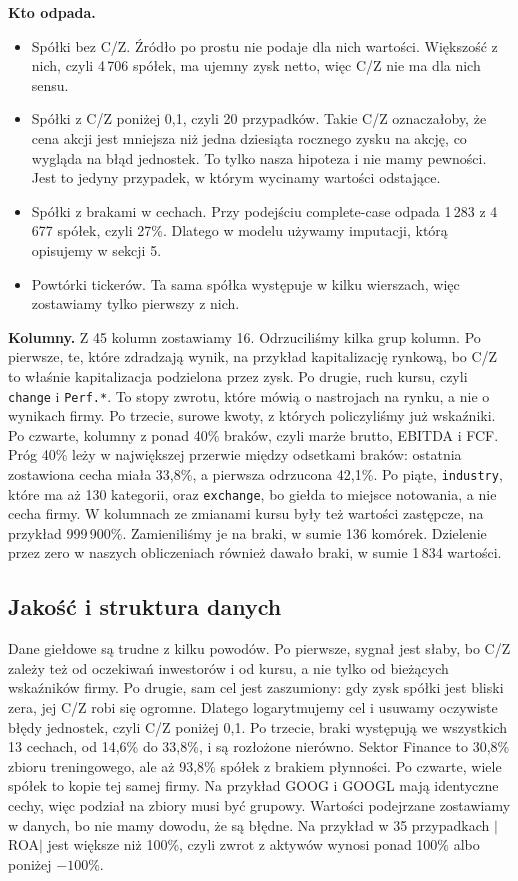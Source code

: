 ﻿\documentclass[10pt,twocolumn,a4paper]{article}
\begin{document}
\textbf{Kto odpada.}
\begin{itemize}
\item Spółki bez C/Z. Źródło po prostu nie podaje dla nich wartości. Większość z nich, czyli 4\,706 spółek, ma ujemny zysk netto, więc C/Z nie ma dla nich sensu.
\item Spółki z C/Z poniżej 0,1, czyli 20 przypadków. Takie C/Z oznaczałoby, że cena akcji jest mniejsza niż jedna dziesiąta rocznego zysku na akcję, co wygląda na błąd jednostek. To tylko nasza hipoteza i nie mamy pewności. Jest to jedyny przypadek, w którym wycinamy wartości odstające.
\item Spółki z brakami w cechach. Przy podejściu complete-case odpada 1\,283 z 4\,677 spółek, czyli 27\%. Dlatego w modelu używamy imputacji, którą opisujemy w sekcji 5.
\item Powtórki tickerów. Ta sama spółka występuje w kilku wierszach, więc zostawiamy tylko pierwszy z nich.
\end{itemize}

\textbf{Kolumny.} Z 45 kolumn zostawiamy 16. Odrzuciliśmy kilka grup kolumn. Po pierwsze, te, które zdradzają wynik, na przykład kapitalizację rynkową, bo C/Z to właśnie kapitalizacja podzielona przez zysk. Po drugie, ruch kursu, czyli \texttt{change} i \texttt{Perf.*}. To stopy zwrotu, które mówią o nastrojach na rynku, a nie o wynikach firmy. Po trzecie, surowe kwoty, z których policzyliśmy już wskaźniki. Po czwarte, kolumny z ponad 40\% braków, czyli marże brutto, EBITDA i FCF. Próg 40\% leży w największej przerwie między odsetkami braków: ostatnia zostawiona cecha miała 33,8\%, a pierwsza odrzucona 42,1\%. Po piąte, \texttt{industry}, które ma aż 130 kategorii, oraz \texttt{exchange}, bo giełda to miejsce notowania, a nie cecha firmy. W kolumnach ze zmianami kursu były też wartości zastępcze, na przykład 999\,900\%. Zamieniliśmy je na braki, w sumie 136 komórek. Dzielenie przez zero w naszych obliczeniach również dawało braki, w sumie 1\,834 wartości.

\subsection{Jakość i struktura danych}
Dane giełdowe są trudne z kilku powodów. Po pierwsze, sygnał jest słaby, bo C/Z zależy też od oczekiwań inwestorów i od kursu, a nie tylko od bieżących wskaźników firmy. Po drugie, sam cel jest zaszumiony: gdy zysk spółki jest bliski zera, jej C/Z robi się ogromne. Dlatego logarytmujemy cel i usuwamy oczywiste błędy jednostek, czyli C/Z poniżej 0,1. Po trzecie, braki występują we wszystkich 13 cechach, od 14,6\% do 33,8\%, i są rozłożone nierówno. Sektor Finance to 30,8\% zbioru treningowego, ale aż 93,8\% spółek z brakiem płynności. Po czwarte, wiele spółek to kopie tej samej firmy. Na przykład GOOG i GOOGL mają identyczne cechy, więc podział na zbiory musi być grupowy. Wartości podejrzane zostawiamy w danych, bo nie mamy dowodu, że są błędne. Na przykład w 35 przypadkach $|$ROA$|$ jest większe niż 100\%, czyli zwrot z aktywów wynosi ponad 100\% albo poniżej $-100\%$.
\end{document}
